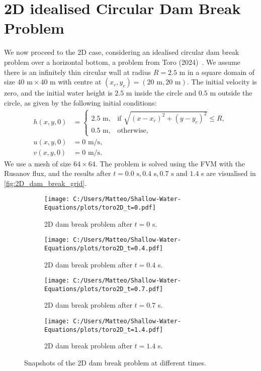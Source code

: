 \section{2D idealised Circular Dam Break Problem}\label{sec:2D_dam_break}
We now proceed to the 2D case, considering an idealised circular dam break problem over a horizontal bottom, a problem from Toro (2024)~\cite{Toro2024}.
We assume there is an infinitely thin circular wall at radius $R = 2.5$ m in a square domain of size $40 \text{ m} \times 40 \text{ m}$ with centre at $(x_c,y_c) = (20 \text{ m}, 20 \text{ m})$.
The initial velocity is zero, and the initial water height is $2.5$ m inside the circle and $0.5$ m outside the circle, as given by the following initial conditions:
\begin{align*}
    h(x,y,0) &= \begin{cases}
        2.5 \text{ m}, & \text{if } \sqrt{ {(x-x_c)}^2 + {(y-y_c)}^2 } \leq R, \\
        0.5 \text{ m}, & \text{otherwise},
    \end{cases} \\
    u(x,y,0) &= 0 \text{ m/s}, \\
    v(x,y,0) &= 0 \text{ m/s}.
\end{align*}
We use a mesh of size $64 \times 64$.
The problem is solved using the FVM with the Rusanov flux, and the results after $t=0.0 \text{ s}, 0.4 \text{ s}, 0.7 \text{ s}$ and $1.4$ s are visualised in \autoref{fig:2D_dam_break_grid}.
\begin{figure}[H]
    \centering
    \begin{subfigure}{0.49\textwidth}
        \centering
        \texttt{[image: C:/Users/Matteo/Shallow-Water-Equations/plots/toro2D\_t=0.pdf]}
        \caption{2D dam break problem after $t=0$ s.}\label{fig:2D_dam_break_t0}
    \end{subfigure}
    \hfill
    \begin{subfigure}{0.49\textwidth}
        \centering
        \texttt{[image: C:/Users/Matteo/Shallow-Water-Equations/plots/toro2D\_t=0.4.pdf]}
        \caption{2D dam break problem after $t=0.4$ s.}\label{fig:2D_dam_break_t0.4}
    \end{subfigure}

    \vspace{0.5cm} %

    \begin{subfigure}{0.49\textwidth}
        \centering
        \texttt{[image: C:/Users/Matteo/Shallow-Water-Equations/plots/toro2D\_t=0.7.pdf]}
        \caption{2D dam break problem after $t=0.7$ s.}\label{fig:2D_dam_break_t0.7}
    \end{subfigure}
    \hfill
    \begin{subfigure}{0.49\textwidth}
        \centering
        \texttt{[image: C:/Users/Matteo/Shallow-Water-Equations/plots/toro2D\_t=1.4.pdf]}
        \caption{2D dam break problem after $t=1.4$ s.}\label{fig:2D_dam_break_t1.4}
    \end{subfigure}

    \caption{Snapshots of the 2D dam break problem at different times.}\label{fig:2D_dam_break_grid}
\end{figure}
